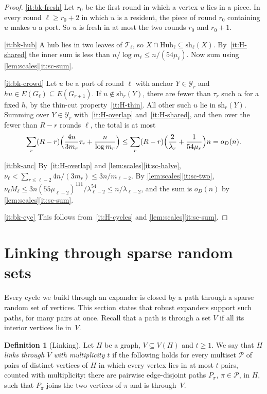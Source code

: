 \documentclass[11pt]{article}
\theoremstyle{definition}
\newtheorem{definition}[theorem]{Definition}
\theoremstyle{remark}
\numberwithin{equation}{section}
\numberwithin{figure}{section}
\numberwithin{table}{section}
\newcommand{\cP}{\mathcal{P}}
\newcommand{\cT}{\mathcal{T}}
\newcommand{\cY}{\mathcal{Y}}
\newcommand{\Hub}{\mathrm{Hub}}
\newcommand{\sh}{\mathrm{sh}}
\newcommand{\oD}{o_D(n)}
\begin{document}
\begin{proof}
\ref{it:bk-fresh} Let $r_0$ be the first round in which a vertex $u$ lies in a
piece. In every round $\ell\ge r_0+2$ in which $u$ is a resident, the piece of
round $r_0$ containing $u$ makes $u$ a port. So $u$ is fresh in at most the two
rounds $r_0$ and $r_0+1$.

\ref{it:bk-hub} A hub lies in two leaves of $\cT_\ell$, so
$X\cap\Hub_\ell\subseteq\sh_\ell(X)$. By~\ref{it:H-shared} the inner sum is
less than $n/\log m_\ell\le n/(54\mu_\ell)$. Now sum using
\cref{lem:scales}\ref{it:sc-sum}.

\ref{it:bk-crowd} Let $u$ be a port of round $\ell$ with anchor $Y\in\cY_r$ and
$hu\in E(G_\ell)\subseteq E(G_{r+1})$. If $u\notin\sh_r(Y)$, there are fewer
than $\tau_r$ such $u$ for a fixed $h$, by the thin-cut
property~\ref{it:H-thin}. All other such $u$ lie in $\sh_r(Y)$. Summing over
$Y\in\cY_r$ with~\ref{it:H-overlap} and~\ref{it:H-shared}, and then over the fewer than $R-r$ rounds
$\ell$, the total is at most
\[
\sum_r(R-r)\Bigl(\frac{4n}{3m_r}\tau_r+\frac{n}{\log m_r}\Bigr)
\le\sum_r(R-r)\Bigl(\frac{2}{\lambda_r}+\frac{1}{54\mu_r}\Bigr)n=\oD.
\]

\ref{it:bk-anc} By~\ref{it:H-overlap} and \cref{lem:scales}\ref{it:sc-halve},
$\nu_\ell<\sum_{r\le\ell-2}4n/(3m_r)\le3n/m_{\ell-2}$. By
\cref{lem:scales}\ref{it:sc-two},
$\nu_\ell M_\ell\le3n(55\mu_{\ell-2})^{111}/\lambda_{\ell-2}^{54}\le
n/\lambda_{\ell-2}$, and the sum is $\oD$ by \cref{lem:scales}\ref{it:sc-sum}.

\ref{it:bk-cyc} This follows from~\ref{it:H-cycles} and
\cref{lem:scales}\ref{it:sc-sum}.
\end{proof}

\section{Linking through sparse random sets}\label{sec:linking}

Every cycle we build through an expander is closed by a path through a sparse
random set of vertices. This section states that robust expanders support such
paths, for many pairs at once. Recall that a path is through a set $V$ if all
its interior vertices lie in~$V$.

\begin{definition}[Linking]\label{def:linking}
Let $H$ be a graph, $V\subseteq V(H)$ and $t\ge1$. We say that $H$ \emph{links
through $V$ with multiplicity $t$} if the following holds for every multiset
$\cP$ of pairs of distinct vertices of $H$ in which every vertex lies in at most
$t$ pairs, counted with multiplicity: there are pairwise edge-disjoint paths
$P_\pi$, $\pi\in\cP$, in $H$, such that $P_\pi$ joins the two vertices of $\pi$
and is through~$V$.
\end{definition}
\end{document}

